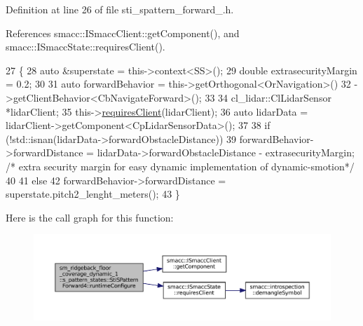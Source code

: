 Definition at line 26 of file sti\+\_\+spattern\+\_\+forward\+\_.\+h.



References smacc\+::\+I\+Smacc\+Client\+::get\+Component(), and smacc\+::\+I\+Smacc\+State\+::requires\+Client().


\begin{DoxyCode}
27       \{
28         \textcolor{keyword}{auto} &superstate = this->context<SS>();
29         \textcolor{keywordtype}{double} extrasecurityMargin = 0.2;
30 
31         \textcolor{keyword}{auto} forwardBehavior = this->getOrthogonal<OrNavigation>()
32                                    ->getClientBehavior<CbNavigateForward>();
33 
34         cl\_lidar::ClLidarSensor *lidarClient;
35         this->\hyperlink{classsmacc_1_1ISmaccState_a7f95c9f0a6ea2d6f18d1aec0519de4ac}{requiresClient}(lidarClient);
36         \textcolor{keyword}{auto} lidarData = lidarClient->getComponent<CpLidarSensorData>();
37 
38         \textcolor{keywordflow}{if} (!std::isnan(lidarData->forwardObstacleDistance))
39           forwardBehavior->forwardDistance = lidarData->forwardObstacleDistance - extrasecurityMargin; \textcolor{comment}{/*
      extra security margin for easy dynamic implementation of dynamic-smotion*/}
40 
41         \textcolor{keywordflow}{else}
42           forwardBehavior->forwardDistance = superstate.pitch2\_lenght\_meters();
43       \}
\end{DoxyCode}
Here is the call graph for this function\+:
\nopagebreak
\begin{figure}[H]
\begin{center}
\leavevmode
\includegraphics[width=350pt]{structsm__ridgeback__floor__coverage__dynamic__1_1_1s__pattern__states_1_1StiSPatternForward4_a9f7c98e1be30e98c9235604a0932684e_cgraph}
\end{center}
\end{figure}
\mbox{\label{structsm__ridgeback__floor__coverage__dynamic__1_1_1s__pattern__states_1_1StiSPatternForward4_a1ada29da5ecc59c90f34eca0dbc89569}} 
